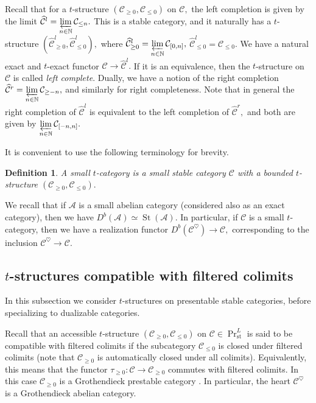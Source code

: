 \documentclass[11pt,leqno]{amsart}
\newtheorem{defi}[theo]{Definition}
\numberwithin{equation}{section}
\def\N{\mathbb{N}}
\newcommand{\prolim}[1][]{\mathop{\varprojlim}\limits_{#1}}
\newcommand{\hhat}{\widehat}
\newcommand{\St}{\operatorname{St}}
\newcommand{\st}{\operatorname{st}}
\newcommand{\cA}{{\mathcal A}}
\newcommand{\cC}{{\mathcal C}}
\begin{document}
Recall that for a $t$-structure $(\cC_{\geq 0},\cC_{\leq 0})$ on $\cC,$ the left completion is given by the limit $\hhat{\cC}^l=\prolim[n\in\N]\cC_{\leq n}.$ This is a stable category, and it naturally has a $t$-structure $(\hhat{\cC}^l_{\geq 0},\hhat{\cC}^l_{\leq 0}),$ where $\hhat{\cC}^l_{\geq 0}=\prolim[n\in\N]\cC_{[0,n]},$ $\hhat{\cC}^l_{\leq 0}=\cC_{\leq 0}.$ We have a natural exact and $t$-exact functor $\cC\to\hhat{\cC}^l.$ If it is an equivalence, then the $t$-structure on $\cC$ is called {\it left complete}. Dually, we have a notion of the right completion $\hhat{\cC}^r=\prolim[n\in\N]\cC_{\geq -n},$ and similarly for right completeness. Note that in general the right completion of $\hhat{\cC}^l$ is equivalent to the left completion of $\hhat{\cC}^r,$ and both are given by $\prolim[n\in\N]\cC_{[-n,n]}.$

It is convenient to use the following terminology for brevity.

\begin{defi}
A small $t$-category is a small stable category $\cC$ with a bounded $t$-structure $(\cC_{\geq 0},\cC_{\leq 0}).$
\end{defi}

We recall that if $\cA$ is a small abelian category (considered also as an exact category), then we have $D^b(\cA)\simeq\St(\cA).$ In particular, if $\cC$ is a small $t$-category, then we have a realization functor $D^b(\cC^{\heartsuit})\to\cC,$ corresponding to the inclusion $\cC^{\heartsuit}\to\cC.$

\subsection{$t$-structures compatible with filtered colimits}

In this subsection we consider $t$-structures on presentable stable categories, before specializing to dualizable categories.

Recall that an accessible $t$-structure $(\cC_{\geq 0},\cC_{\leq 0})$ on $\cC\in\Pr^L_{\st}$ is said to be compatible with filtered colimits if the subcategory $\cC_{\leq 0}$ is closed under filtered colimits (note that $\cC_{\geq 0}$ is automatically closed under all colimits). Equivalently, this means that the functor $\tau_{\geq 0}:\cC\to\cC_{\geq 0}$ commutes with filtered colimits. In this case $\cC_{\geq 0}$ is a Grothendieck prestable category \cite[Proposition C.1.4.1]{Lur18}. In particular, the heart $\cC^{\heartsuit}$ is a Grothendieck abelian category.
\end{document}
